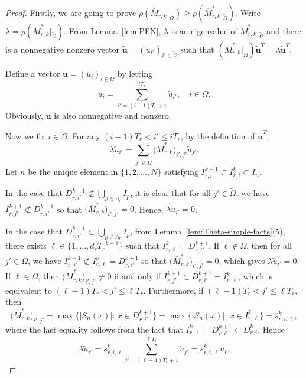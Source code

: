 \documentclass[11pt]{amsart}
\theoremstyle{definition}
\theoremstyle{remark}
\numberwithin{equation}{section}
\newcommand{\bfu}{{\mathbf u}}
\newcommand{\I}{{\mathcal I}}
\newcommand{\upM}{{\overline{M}}}
\newcommand{\ups}{{\overline{s} }}
\def\wdt{\widetilde}
\begin{document}
\begin{proof}

Firstly, we are going to prove $\rho(\upM_{r,k} |_\Omega)\geq \rho(\upM_{r,k}^* |_{\wdt{\Omega}})$.
Write $\lambda=\rho(\upM_{r,k}^*|_{\wdt{\Omega}} )$.
From Lemma~\ref{lem:PFN}, 
$\lambda$ is an eigenvalue of $\upM_{r,k}^* |_{\wdt{\Omega}}$ and there is a nonnegative nonzero vector 
$ \wdt\bfu=(\wdt{u}_{i'})_{i'\in \wdt{\Omega}}$ such that $(\upM_{r,k}^* |_{\wdt{\Omega}}) \wdt\bfu^T =\lambda \wdt\bfu^T$.

Define a vector $\bfu=(u_i)_{i\in\Omega}$ by letting
\[
{u}_i=\sum_{i'=(i-1)T_r+1}^{iT_r} \wdt{u}_{i'}, \quad i\in\Omega.
\]
Obviously, $\bfu$ is also nonnegative and nonzero. 


Now we fix $i\in \Omega$. For any $(i-1)T_r<i'\leq iT_r$, by the definition of $\wdt\bfu^T$,
\[
  \lambda \wdt{u}_{i'} =\sum_{j'\in \wdt{\Omega}} \big(\upM_{r,k}^*\big)_{i',j'}  \wdt{u}_{j'}.
\]
Let $n$ be the unique element in $\{1,2,\ldots,N\}$ satisfying $I_{r,i'}^{k+1}\subset I_{r,i}^k\subset I_n$.

In the case that $D_{r,i'}^{k+1}\not\subset \bigcup_{p\in \Lambda_r} I_p$, it is clear that for all $j'\in\wdt{\Omega}$, we have $I^{k+1}_{r,j'}\not\subset D_{r,i'}^{k+1}$ so that $\big(\upM_{r,k}^*\big)_{i',j'}=0$. Hence, $\lambda \wdt{u}_{i'}=0$.  

In the case that $D_{r,i'}^{k+1}\subset \bigcup_{p\in \Lambda_r} I_p$, from Lemma~\ref{lem:Theta-simple-facts}(5), there exists $\ell\in\{1,\ldots,d_r{T_r}^{k-1}\}$ such that $I_{r,\ell}^k=D_{r,i'}^{k+1}$. If $\ell\not\in\Omega$, then for all $j'\in\wdt{\Omega}$, we have $I^{k+1}_{r,j'}\not\subset I_{r,\ell}^k= D_{r,i'}^{k+1}$ so that $\big(\upM_{r,k}^*\big)_{i',j'}=0$, which gives $\lambda \wdt{u}_{i'}=0$. If $\ell\in\Omega$, then 
$\big(\upM_{r,k}^*\big)_{i',j'}\not=0$ if and only if $I^{k+1}_{r,j'}\subset D_{r,i'}^{k+1}=I^k_{r,\ell}$, which is equivalent to $(\ell-1)T_r<j'\leq \ell T_r$. Furthermore, if $(\ell-1)T_r<j'\leq \ell T_r$, then
\[
\big(\upM_{r,k}^*\big)_{i',j'}=\max \big\{|S_n(x)|:\, x\in D^{k+1}_{r,i'} \big\}
=\max\big\{|S_n(x)|:\, x\in I^k_{r,\ell}\big\}=\ups_{r,i,\ell}^k,
\]
where the last equality follows from the fact that $I_{r,\ell}^k=D_{r,i'}^{k+1}\subset D_{r,i}^k$. Hence
\[
\lambda \wdt{u}_{i'} = \ups_{r,i,\ell}^k \sum_{j'=(\ell-1)T_r+1}^{ \ell T_r } \wdt{u}_{j'}
=\ups_{r,i,\ell}^k  {u}_{\ell}.
\]


\end{proof}
\end{document}
